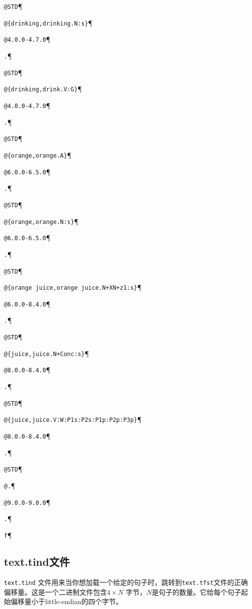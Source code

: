 \noindent\verb$@STD$\P

\noindent\verb$@{drinking,drinking.N:s}$\P

\noindent\verb$@4.0.0-4.7.0$\P

\noindent\verb$.$\P

\noindent\verb$@STD$\P

\noindent\verb$@{drinking,drink.V:G}$\P

\noindent\verb$@4.0.0-4.7.0$\P

\noindent\verb$.$\P

\noindent\verb$@STD$\P

\noindent\verb$@{orange,orange.A}$\P

\noindent\verb$@6.0.0-6.5.0$\P

\noindent\verb$.$\P

\noindent\verb$@STD$\P

\noindent\verb$@{orange,orange.N:s}$\P

\noindent\verb$@6.0.0-6.5.0$\P

\noindent\verb$.$\P

\noindent\verb$@STD$\P

\noindent\verb$@{orange juice,orange juice.N+XN+z1:s}$\P

\noindent\verb$@6.0.0-8.4.0$\P

\noindent\verb$.$\P

\noindent\verb$@STD$\P

\noindent\verb$@{juice,juice.N+Conc:s}$\P

\noindent\verb$@8.0.0-8.4.0$\P

\noindent\verb$.$\P

\noindent\verb$@STD$\P

\noindent\verb$@{juice,juice.V:W:P1s:P2s:P1p:P2p:P3p}$\P

\noindent\verb$@8.0.0-8.4.0$\P

\noindent\verb$.$\P

\noindent\verb$@STD$\P

\noindent\verb$@.$\P

\noindent\verb$@9.0.0-9.0.0$\P

\noindent\verb$.$\P

\noindent\verb$f$\P






\subsection{ text.tind文件}
 \verb+text.tind+ 文件用来当你想加载一个给定的句子时，跳转到\verb+text.tfst+文件的正确偏移量。这是一个二进制文件包含$4
\times N$ 字节，$N$是句子的数量。它给每个句子起始偏移量小于little-endian的四个字节。
 


